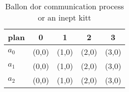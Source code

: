 \documentclass[a4paper]{article}
\begin{document}
\begin{table}
\begin{adjustbox}{width=0.6\columnwidth}
\begin{tabular}{|l|l|l|l|l|}
\hline
\textbf{plan} & \multicolumn{1}{c|}{\textbf{0}} & \multicolumn{1}{c|}{\textbf{1}} & \multicolumn{1}{c|}{\textbf{2}} & \multicolumn{1}{c|}{\textbf{3}} \\ \hline
\textbf{$a_0$}  & (0,0) & (1,0) & (2,0) & (3,0) \\ \hline
\textbf{$a_1$}  & (0,0) & (1,0) & (2,0) & (3,0) \\ \hline
\textbf{$a_2$}  & (0,0) & (1,0) & (2,0) & (3,0) \\ \hline
\end{tabular}
\end{adjustbox}
\caption{Ballon dor communication process or an inept kitt
}
\end{table}
\end{document}
